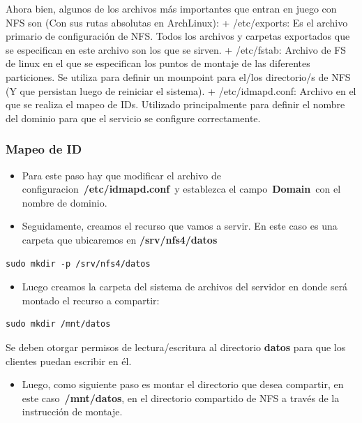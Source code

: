 \documentclass[12pt]{extarticle}
\providecommand{\tightlist}{%
      \setlength{\itemsep}{0pt}\setlength{\parskip}{0pt}}
\begin{document}
Ahora bien, algunos de los archivos más importantes que entran en juego
con NFS son (Con sus rutas absolutas en ArchLinux): + /etc/exports: Es
el archivo primario de configuración de NFS. Todos los archivos y
carpetas exportados que se especifican en este archivo son los que se
sirven. + /etc/fstab: Archivo de FS de linux en el que se especifican
los puntos de montaje de las diferentes particiones. Se utiliza para
definir un mounpoint para el/los directorio/s de NFS (Y que persistan
luego de reiniciar el sistema). + /etc/idmapd.conf: Archivo en el que se
realiza el mapeo de IDs. Utilizado principalmente para definir el nombre
del dominio para que el servicio se configure correctamente.

\subsubsection{Mapeo de ID}\label{mapeo-de-id}

\begin{itemize}
\item
  Para este paso hay que modificar el archivo de
  configuracion~\textbf{/etc/idmapd.conf}~y establezca el
  campo~\textbf{Domain}~con el nombre de dominio.
\item
  Seguidamente, creamos el recurso que vamos a servir. En este caso es
  una carpeta que ubicaremos en \textbf{/srv/nfs4/datos}
\end{itemize}

\begin{verbatim}
sudo mkdir -p /srv/nfs4/datos
\end{verbatim}

\begin{itemize}
\tightlist
\item
  Luego creamos la carpeta del sistema de archivos del servidor en donde
  será montado el recurso a compartir:
\end{itemize}

\begin{verbatim}
sudo mkdir /mnt/datos
\end{verbatim}

Se deben otorgar permisos de lectura/escritura al directorio
\textbf{datos} para que los clientes puedan escribir en él.

\begin{itemize}
\tightlist
\item
  Luego, como siguiente paso es montar el directorio que desea
  compartir, en este caso~\textbf{/mnt/datos}, en el directorio
  compartido de NFS a través de la instrucción de montaje.
\end{itemize}
\end{document}
